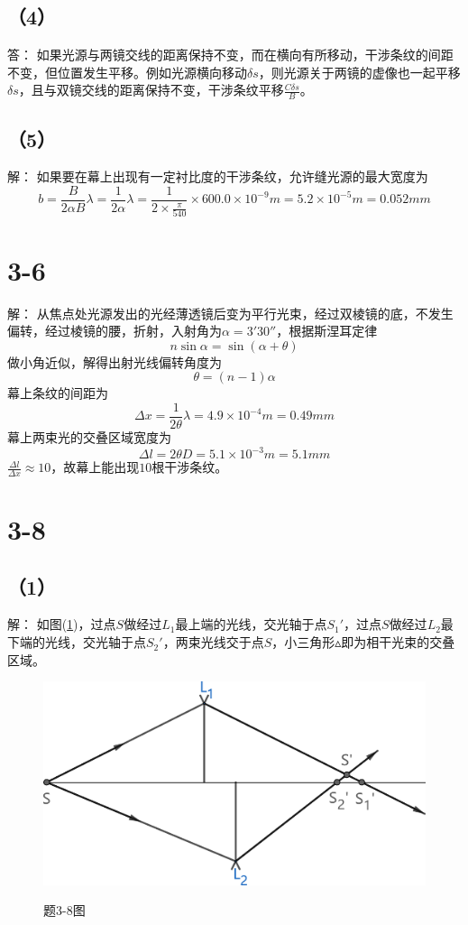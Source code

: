 \documentclass[10pt,a4paper]{article}
\begin{document}
\subsection*{（4）}答：
如果光源与两镜交线的距离保持不变，而在横向有所移动，干涉条纹的间距不变，但位置发生平移。例如光源横向移动$\delta s$，则光源关于两镜的虚像也一起平移$\delta s$，且与双镜交线的距离保持不变，干涉条纹平移$\frac{C\delta s}{B}$。
\subsection*{（5）}解：
如果要在幕上出现有一定衬比度的干涉条纹，允许缝光源的最大宽度为
\[
b = \frac{B}{2\alpha B}\lambda = \frac{1}{2\alpha}\lambda = \frac{1}{2\times\frac{\pi}{540}}\times600.0\times10^{-9}m = 5.2\times10^{-5}m = 0.052mm
\]
\section*{3-6}解：
从焦点处光源发出的光经薄透镜后变为平行光束，经过双棱镜的底，不发生偏转，经过棱镜的腰，折射，入射角为$\alpha = 3'30''$，根据斯涅耳定律
\[
n\sin\alpha = \sin(\alpha + \theta)
\]
做小角近似，解得出射光线偏转角度为
\[
\theta = (n - 1)\alpha
\]
幕上条纹的间距为
\[
\Delta x = \frac{1}{2\theta}\lambda = 4.9\times10^{-4}m = 0.49mm
\]
幕上两束光的交叠区域宽度为
\[
\Delta l = 2\theta D = 5.1\times10^{-3}m = 5.1mm
\]
$\frac{\Delta l}{\Delta x} \approx 10$，故幕上能出现$10$根干涉条纹。
\section*{3-8}
\subsection*{（1）}解：
如图(\ref{3-8})，过点$S$做经过$L_1$最上端的光线，交光轴于点$S_1'$，过点$S$做经过$L_2$最下端的光线，交光轴于点$S_2'$，两束光线交于点$S$，小三角形$\vartriangle$即为相干光束的交叠区域。
\begin{figure}[h]
\centering
\includegraphics[scale=.2]{Homework_4_3-8(tailored).png}\\
\caption{题3-8图}\label{3-8}
\end{figure}
\end{document}
